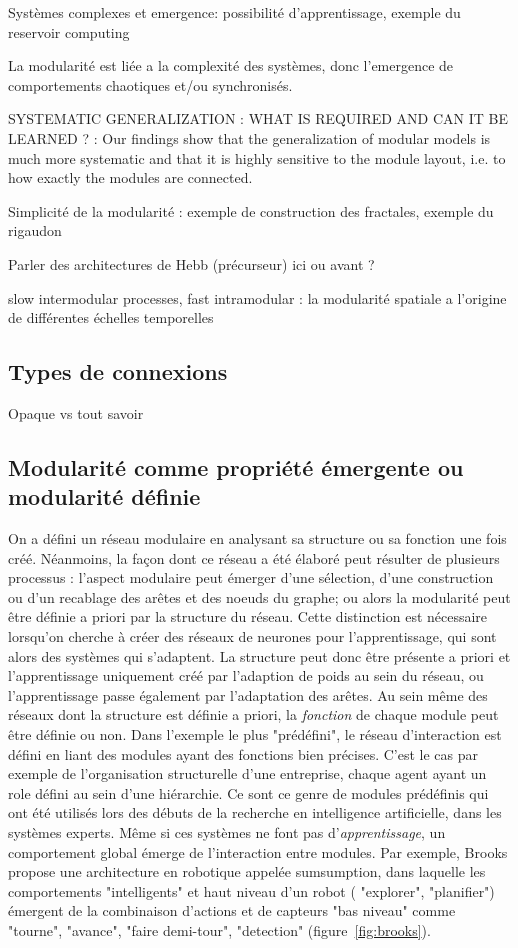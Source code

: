 Systèmes complexes et emergence: possibilité d'apprentissage, exemple du reservoir computing

La modularité est liée a la complexité des systèmes, donc l'emergence de comportements chaotiques et/ou synchronisés. 

SYSTEMATIC GENERALIZATION : WHAT IS REQUIRED
AND CAN IT BE LEARNED ? : 
Our findings show that the generalization of modular models is much more systematic and that it is highly sensitive to the module layout, i.e. to how exactly the modules are connected.

Simplicité de la modularité : exemple de construction des fractales, exemple du rigaudon

Parler des architectures de Hebb (précurseur) ici ou avant ?

slow intermodular processes, fast intramodular : la modularité spatiale a l'origine de différentes échelles temporelles \cite{Pan2009ModularityPS}


\subsection{Types de connexions}

Opaque vs tout savoir


\subsection{Modularité comme propriété émergente ou modularité définie}

On a défini un réseau modulaire en analysant sa structure ou sa fonction une fois créé. Néanmoins, la façon dont ce réseau a été élaboré peut résulter de plusieurs processus : l'aspect modulaire peut émerger d'une sélection, d'une construction ou d'un recablage des arêtes et des noeuds du graphe; ou alors la modularité peut être définie a priori par la structure du réseau. Cette distinction est nécessaire lorsqu'on cherche à créer des réseaux de neurones pour l'apprentissage, qui sont alors des systèmes qui s'adaptent. La structure peut donc être présente a priori et l'apprentissage uniquement créé par l'adaption de poids au sein du réseau, ou l'apprentissage passe également par l'adaptation des arêtes.
Au sein même des réseaux dont la structure est définie a priori, la \emph{fonction} de chaque module peut être définie ou non. Dans l'exemple le plus "prédéfini", le réseau d'interaction est défini en liant des modules ayant des fonctions bien précises. C'est le cas par exemple de l'organisation structurelle d'une entreprise, chaque agent ayant un role défini au sein d'une hiérarchie. Ce sont ce genre de modules prédéfinis qui ont été utilisés lors des débuts de la recherche en intelligence artificielle, dans les systèmes experts. Même si ces systèmes ne font pas d'\emph{apprentissage}, un comportement global émerge de l'interaction entre modules. Par exemple, Brooks \cite{brooks_sumsumption_85} propose une architecture en robotique appelée sumsumption, dans laquelle les comportements "intelligents" et haut niveau d'un robot ( "explorer", "planifier") émergent de la combinaison d'actions et de capteurs "bas niveau" comme "tourne", "avance", "faire demi-tour", "detection" (figure~\ref{fig:brooks}).

